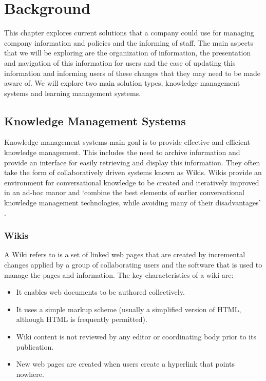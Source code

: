 \chapter{Background}
This chapter explores current solutions that a company could use for managing company information and policies and the informing of staff. The main aspects that we will be exploring are the organization of information, the presentation and navigation of this information for users and the ease of updating this information and informing users of these changes that they may need to be made aware of. We will explore two main solution types, knowledge management systems and learning management systems.

\section{Knowledge Management Systems}
Knowledge management systems main goal is to provide effective and efficient knowledge management. This includes the need to archive information and provide an interface for easily retrieving and display this information. They often take the form of collaboratively driven systems known as Wikis. Wikis provide an environment for conversational knowledge to be created and iteratively improved in an ad-hoc manor and `combine the best elements of earlier conversational knowledge management technologies, while avoiding many of their disadvantages' \cite{maier2011knowledge, leuf2001wiki}.

\subsection{Wikis}
A Wiki refers to is a set of linked web pages that are created by incremental changes applied by a group of collaborating users and the software that is used to manage the pages and information. The key characteristics of a wiki are:

\begin{itemize}
\item It enables web documents to be authored collectively.
\item It uses a simple markup scheme (usually a simplified version of HTML, although HTML is frequently permitted).
\item Wiki content is not reviewed by any editor or coordinating body prior to its publication.
\item New web pages are created when users create a hyperlink that points nowhere.
\end{itemize}

